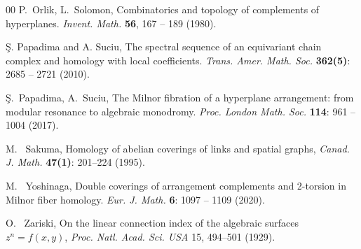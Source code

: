 \documentclass[11pt]{amsart}
\theoremstyle{plain}
\theoremstyle{definition}
\begin{document}
\begin{thebibliography}{00}
 P.~Orlik, L.~Solomon, Combinatorics and topology of complements of hyperplanes. \textit{Invent. Math.} \textbf{56}, 167 -- 189 (1980).
 
 
 \c{S}. Papadima and A. Suciu, The spectral sequence of an equivariant chain complex and homology with local coefficients. \textit{Trans. Amer. Math. Soc.} \textbf{362(5)}: 2685 -- 2721 (2010).

 \c{S}.~Papadima, A.~Suciu, The Milnor fibration of a hyperplane arrangement:
from modular resonance to algebraic monodromy. \textit{Proc. London Math. Soc.} \textbf{114}: 961 -- 1004 (2017). 

  M.~ Sakuma, Homology of abelian coverings of links and spatial graphs, {\it Canad. J. Math.} {\bf 47(1)}:  201--224 (1995).

 M. ~Yoshinaga, Double coverings of arrangement complements and 2-torsion in Milnor fiber homology. \textit{Eur. J. Math.} \textbf{6}: 1097 -- 1109 (2020).

 O. ~Zariski, On the linear connection index of the algebraic surfaces $z^n = f(x, y)$, {\it Proc. Natl.
Acad. Sci. USA} 15, 494--501  (1929).

\end{thebibliography}
\end{document}
